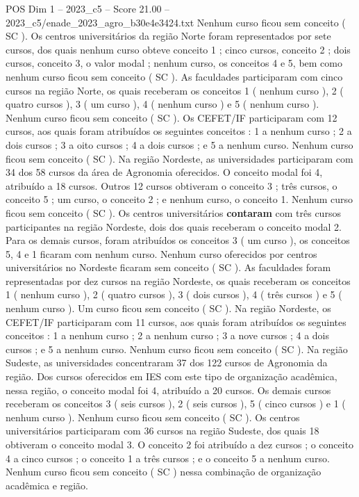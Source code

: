 \begin{textsample}{POS Dim 1 – 2023\_c5 – Score 21.00 – 2023\_c5/enade\_2023\_agro\_b30e4e3424.txt}
Nenhum curso ficou sem conceito ( SC ).
Os centros universitários da região Norte foram representados por sete cursos, dos quais nenhum curso obteve conceito 1 ; cinco cursos, conceito 2 ; dois cursos, conceito 3, o valor modal ; nenhum curso, os conceitos 4 e 5, bem como nenhum curso ficou sem conceito ( SC ).
As faculdades participaram com cinco cursos na região Norte, os quais receberam os conceitos 1 ( nenhum curso ), 2 ( quatro cursos ), 3 ( um curso ), 4 ( nenhum curso ) e 5 ( nenhum curso ).
Nenhum curso ficou sem conceito ( SC ).
Os CEFET/IF participaram com 12 cursos, aos quais foram atribuídos os seguintes conceitos : 1 a nenhum curso ; 2 a dois cursos ; 3 a oito cursos ; 4 a dois cursos ; e 5 a nenhum curso.
Nenhum curso ficou sem conceito ( SC ).
Na região Nordeste, as universidades participaram com 34 dos 58 cursos da área de Agronomia oferecidos.
O conceito modal foi 4, atribuído a 18 cursos.
Outros 12 cursos obtiveram o conceito 3 ; três cursos, o conceito 5 ; um curso, o conceito 2 ; e nenhum curso, o conceito 1.
Nenhum curso ficou sem conceito ( SC ).
Os centros universitários \textbf{contaram} com três cursos participantes na região Nordeste, dois dos quais receberam o conceito modal 2.
Para os demais cursos, foram atribuídos os conceitos 3 ( um curso ), os conceitos 5, 4 e 1 ficaram com nenhum curso.
Nenhum curso oferecidos por centros universitários no Nordeste ficaram sem conceito ( SC ).
As faculdades foram representadas por dez cursos na região Nordeste, os quais receberam os conceitos 1 ( nenhum curso ), 2 ( quatro cursos ), 3 ( dois cursos ), 4 ( três cursos ) e 5 ( nenhum curso ).
Um curso ficou sem conceito ( SC ).
Na região Nordeste, os CEFET/IF participaram com 11 cursos, aos quais foram atribuídos os seguintes conceitos : 1 a nenhum curso ; 2 a nenhum curso ; 3 a nove cursos ; 4 a dois cursos ; e 5 a nenhum curso.
Nenhum curso ficou sem conceito ( SC ).
Na região Sudeste, as universidades concentraram 37 dos 122 cursos de Agronomia da região.
Dos cursos oferecidos em IES com este tipo de organização acadêmica, nessa região, o conceito modal foi 4, atribuído a 20 cursos.
Os demais cursos receberam os conceitos 3 ( seis cursos ), 2 ( seis cursos ), 5 ( cinco cursos ) e 1 ( nenhum curso ).
Nenhum curso ficou sem conceito ( SC ).
Os centros universitários participaram com 36 cursos na região Sudeste, dos quais 18 obtiveram o conceito modal 3.
O conceito 2 foi atribuído a dez cursos ; o conceito 4 a cinco cursos ; o conceito 1 a três cursos ; e o conceito 5 a nenhum curso.
Nenhum curso ficou sem conceito ( SC ) nessa combinação de organização acadêmica e região.

\end{textsample}
